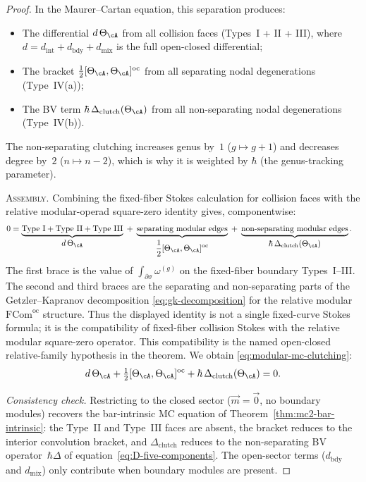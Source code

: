 \begin{proof}
In the Maurer--Cartan equation, this separation produces:
\begin{itemize}
\item The differential $d\,\Theta_\cA$ from all collision
 faces (Types~I + II + III), where $d = d_{\mathrm{int}}
 + d_{\mathrm{bdy}} + d_{\mathrm{mix}}$ is the full
 open-closed differential;
\item The bracket $\frac{1}{2}[\Theta_\cA, \Theta_\cA]^{\mathrm{oc}}$
 from all separating nodal degenerations (Type~IV(a));
\item The BV term $\hbar\,\Delta_{\mathrm{clutch}}(\Theta_\cA)$
 from all non-separating nodal degenerations (Type~IV(b)).
\end{itemize}
The non-separating clutching increases genus by~$1$
($g \mapsto g + 1$) and decreases degree by~$2$
($n \mapsto n - 2$), which is why it is weighted by $\hbar$
(the genus-tracking parameter).

\medskip
\noindent\textsc{Assembly.}
Combining the fixed-fiber Stokes calculation for collision faces with
the relative modular-operad square-zero identity gives, componentwise:
\begin{align}
0
&=
\underbrace{\text{Type~I} + \text{Type~II}
 + \text{Type~III}}_{\displaystyle d\,\Theta_\cA}
 \;+\;
 \underbrace{\text{separating modular edges}}_{\displaystyle
 \frac{1}{2}[\Theta_\cA, \Theta_\cA]^{\mathrm{oc}}}
 \;+\;
 \underbrace{\text{non-separating modular edges}}_{\displaystyle
 \hbar\,\Delta_{\mathrm{clutch}}(\Theta_\cA)}.
 \label{eq:modular-two-source-assembly}
\end{align}
The first brace is the value of
$\int_{\partial\sigma}\omega^{(g)}$ on the fixed-fiber boundary
Types~I--III. The second and third braces are the separating and
non-separating parts of the Getzler--Kapranov decomposition
\eqref{eq:gk-decomposition} for the relative modular
$\mathrm{FCom}^{\mathrm{oc}}$ structure. Thus the displayed identity
is not a single fixed-curve Stokes formula; it is the compatibility of
fixed-fiber collision Stokes with the relative modular square-zero
operator. This compatibility is the named open-closed relative-family
hypothesis in the theorem. We obtain
\eqref{eq:modular-mc-clutching}:
\[
d\,\Theta_\cA
+ \tfrac{1}{2}[\Theta_\cA, \Theta_\cA]^{\mathrm{oc}}
+ \hbar\,\Delta_{\mathrm{clutch}}(\Theta_\cA)
= 0.
\]

\emph{Consistency check.}
Restricting to the closed sector
($\vec{m} = \vec{0}$, no boundary modules) recovers the
bar-intrinsic MC equation of Theorem~\ref{thm:mc2-bar-intrinsic}:
the Type~II and Type~III faces are absent, the bracket reduces
to the interior convolution bracket, and
$\Delta_{\mathrm{clutch}}$ reduces to the non-separating BV
operator~$\hbar\Delta$ of
equation~\eqref{eq:D-five-components}. The open-sector terms
($d_{\mathrm{bdy}}$ and $d_{\mathrm{mix}}$) only contribute when
boundary modules are present.
\end{proof}

